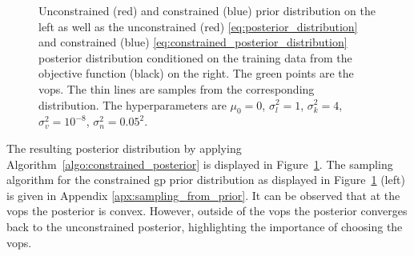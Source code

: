 \begin{figure}[h]
    \centering
    
    \caption[Comparing unconstrained and constrained prior and posterior distributions.]{Unconstrained (red) and constrained (blue) prior distribution on the left as well as the unconstrained (red) \eqref{eq:posterior_distribution} and constrained (blue) \eqref{eq:constrained_posterior_distribution} posterior distribution conditioned on the training data from the objective function (black) on the right. The green points are the \glspl{vop}. The thin lines are samples from the corresponding distribution. The hyperparameters are $\mu_0=0$, $\sigma
   ^2_l = 1$, $\sigma_k^2 = 4$, $\sigma_v^2 = 10^{-8}$, $\sigma_n^2 = 0.05^2$.}
   \label{fig:constrained_gp_example}
\end{figure}
The resulting posterior distribution by applying Algorithm~\ref{algo:constrained_posterior} is displayed in Figure~\ref{fig:constrained_gp_example}.
The sampling algorithm for the constrained \gls{gp} prior distribution as displayed in Figure~\ref{fig:constrained_gp_example} (left) is given in Appendix \ref{apx:sampling_from_prior}. It can be observed that at the \glspl{vop} the posterior is convex. However, outside of the \glspl{vop} the posterior converges back to the unconstrained posterior, highlighting the importance of choosing the \glspl{vop}.
